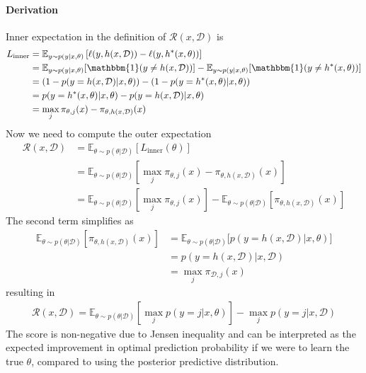 \paragraph{Derivation}
Inner expectation in the definition of $\mathcal{R}(x, \mathcal{D})$ is
\begin{align}
L_{\text{inner}}&= \mathbb{E}_{y \sim p(y|x, \theta)} \left[ \ell(y,h(x,\mathcal{D})) - \ell(y,h^*(x, \theta)) \right] \nonumber \\
&= \mathbb{E}_{y \sim p(y|x, \theta)} [\mathbbm{1}(y \neq h(x,\mathcal{D}))] - \mathbb{E}_{y \sim p(y|x, \theta)} [\mathbbm{1}(y \neq h^*(x, \theta))] \nonumber \\
&= (1 - p(y = h(x,\mathcal{D}) | x, \theta)) - (1 - p(y = h^*(x, \theta) | x, \theta)) \nonumber \\
&= p(y = h^*(x, \theta) | x, \theta) - p(y = h(x,\mathcal{D}) | x, \theta) \nonumber \\
&= \max_{j} \pi_{\theta,j}(x) - \pi_{\theta, h(x,\mathcal{D})}(x)
\end{align}
Now we need to compute the outer expectation
\begin{align}
\mathcal{R}(x, \mathcal{D}) &= \mathbb{E}_{\theta \sim p(\theta|\mathcal{D})} [L_{\text{inner}}(\theta)] \nonumber \\
&= \mathbb{E}_{\theta \sim p(\theta|\mathcal{D})} \left[ \max_{j} \pi_{\theta,j}(x) - \pi_{\theta, h(x,\mathcal{D})}(x) \right] \nonumber \\
&= \mathbb{E}_{\theta \sim p(\theta|\mathcal{D})} \left[ \max_{j} \pi_{\theta,j}(x) \right] - \mathbb{E}_{\theta \sim p(\theta|\mathcal{D})} \left[ \pi_{\theta, h(x,\mathcal{D})}(x) \right]
\end{align}
The second term simplifies as
\begin{align}
\mathbb{E}_{\theta \sim p(\theta|\mathcal{D})} \left[ \pi_{\theta, h(x,\mathcal{D})}(x) \right] &= \mathbb{E}_{\theta \sim p(\theta|\mathcal{D})} \big[ p(y=h(x,\mathcal{D}) | x, \theta) \big] \nonumber \\
&= p(y=h(x,\mathcal{D}) | x, \mathcal{D}) \nonumber \\
&= \max_{j} \pi_{\mathcal{D},j}(x)
\end{align}
resulting in
\begin{align}
\mathcal{R}(x, \mathcal{D}) = \boxed{\mathbb{E}_{\theta \sim p(\theta|\mathcal{D})} \left[ \max_{j} p(y=j|x,\theta) \right] - \max_{j} p(y=j|x,\mathcal{D})}
\end{align}
The score is non-negative due to Jensen inequality and can be interpreted as the expected improvement in optimal prediction probability if we were to learn the true $\theta$, compared to using the posterior predictive distribution. 

